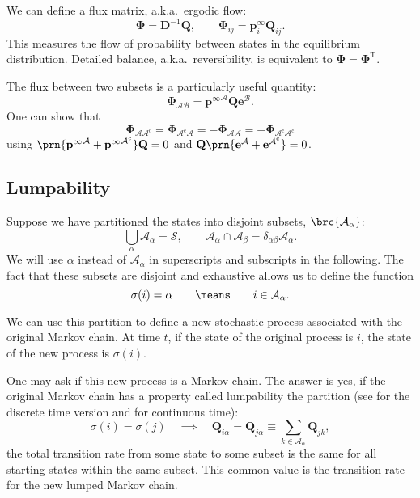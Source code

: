 \documentclass[12pt]{article}
\newcommand{\inv}{^{-1}}
\newcommand{\trans}{^\mathrm{T}}
\newcommand{\onev}{\mathbf{e}}
\newcommand{\MM}{\mathbf{Q}}
\newcommand{\eq}{\mathbf{p}^\infty}
\newcommand{\D}{\mathbf{D}}
\newcommand{\F}{\boldsymbol{\Phi}}
\newcommand{\CS}{\mathcal{S}}
\newcommand{\CA}{\mathcal{A}}
\newcommand{\CB}{\mathcal{B}}
\newcommand{\comp}{^\mathrm{c}}
\begin{document}
We can define a flux matrix, a.k.a.\ ergodic flow:
%
\begin{equation}\label{eq:flux}
  \F = \D\inv\MM,
  \qquad
  \F_{ij} = \eq_i \MM_{ij}.
\end{equation}
%
This measures the flow of probability between states in the equilibrium distribution.
Detailed balance, a.k.a.\ reversibility, is equivalent to $\F=\F\trans$.

The flux between two subsets is a particularly useful quantity:
%
\begin{equation}\label{eq:subflux}
  \F_{\CA\CB} = {\eq}^\CA\MM\onev^\CB.
\end{equation}
%
One can show that
%
\begin{equation}\label{eq:compflux}
  \F_{\CA\CA\comp} = \F_{\CA\comp\CA} = -\F_{\CA\CA} = -\F_{\CA\comp\CA\comp}
\end{equation}
%
using $\prn{{\eq}^\CA + {\eq}^{\CA\comp}}\MM=0$ and $\MM\prn{{\onev}^\CA + {\onev}^{\CA\comp}}=0$.

\subsection{Lumpability}\label{sec:lump}

Suppose we have partitioned the states into disjoint subsets, $\brc{\CA_\alpha}$:
%
\begin{equation}\label{eq:partition}
  \bigcup_\alpha \CA_\alpha = \CS,
  \qquad
  \CA_\alpha \cap \CA_\beta = \delta_{\alpha\beta}\CA_\alpha.
\end{equation}
%
We will use $\alpha$ instead of $\CA_\alpha$ in superscripts and subscripts in the following.
The fact that these subsets are disjoint and exhaustive allows us to define the function
%
\begin{equation}\label{eq:whichsey}
  \sigma(i)=\alpha
  \qquad\means\qquad
  i\in\CA_\alpha.
\end{equation}
%

We can use this partition to define a new stochastic process associated with the original Markov chain.
At time $t$, if the state of the original process is $i$, the state of the new process is $\sigma(i)$.

One may ask if this new process is a Markov chain.
The answer is yes, if the original Markov chain has a property called lumpability \wrt the partition
(see \cite[\S6.3]{kemeny1960finite} for the discrete time version and \cite{burke1958markovian,Ball1993Lumpability} for continuous time):
%
\begin{equation}\label{eq:lump}
  \sigma(i)=\sigma(j)
  \quad\implies \quad
  \MM_{i\alpha}=\MM_{j\alpha} \equiv \sum_{k\in\CA_\alpha} \MM_{jk},
\end{equation}
%
\ie the total transition rate from some state to some subset is the same for all starting states within the same subset.
This common value is the transition rate for the new lumped Markov chain.
\end{document}
